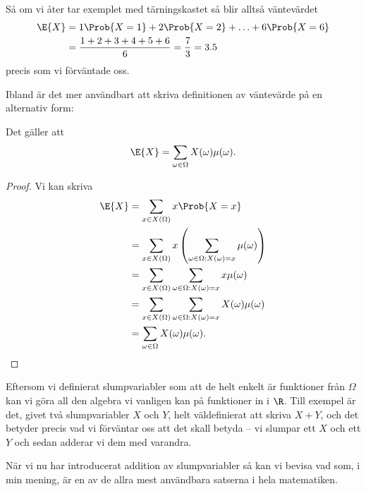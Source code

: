 \documentclass[nobib]{tufte-handout}
\begin{document}
\begin{example}
    Så om vi åter tar exemplet med tärningskastet så blir alltså väntevärdet
    \begin{align*}
        \E{X} &= 1\Prob{X = 1} + 2\Prob{X = 2} + \ldots + 6\Prob{X = 6}\\
        &= \frac{1 + 2 + 3 + 4 + 5 + 6}{6} = \frac{7}{3} = 3.5
    \end{align*}
    precis som vi förväntade oss.
\end{example}

Ibland är det mer användbart att skriva definitionen av väntevärde på en alternativ form:

\begin{lemma}\label{lemma_expectation_as_sum_over_omegas}
    Det gäller att
    $$\E{X} = \sum_{\omega \in \Omega} X(\omega)\mu(\omega).$$

    \begin{proof}
        Vi kan skriva
        \begin{align*}
            \E{X} &= \sum_{x \in X(\Omega)} x \Prob{X = x}\\
            &= \sum_{x \in X(\Omega)} x\left(\sum_{\omega \in \Omega: X(\omega) = x} \mu(\omega)\right)\\
            &= \sum_{x \in X(\Omega)} \sum_{\omega \in \Omega: X(\omega) = x} x\mu(\omega)\\
            &= \sum_{x \in X(\Omega)} \sum_{\omega \in \Omega: X(\omega) = x} X(\omega)\mu(\omega)\\
            &= \sum_{\omega \in \Omega} X(\omega)\mu(\omega).
        \end{align*}
    \end{proof}
\end{lemma}

Eftersom vi definierat slumpvariabler som att de helt enkelt är funktioner från $\Omega$ kan vi göra all den algebra vi vanligen kan på funktioner in i $\R$. Till exempel är det, givet två slumpvariabler $X$ och $Y$, helt väldefinierat att skriva $X + Y$, och det betyder precis vad vi förväntar oss att det skall betyda -- vi slumpar ett $X$ och ett $Y$ och sedan adderar vi dem med varandra.

När vi nu har introducerat addition av slumpvariabler så kan vi bevisa vad som, i min mening, är en av de allra mest användbara satserna i hela matematiken.
\end{document}
